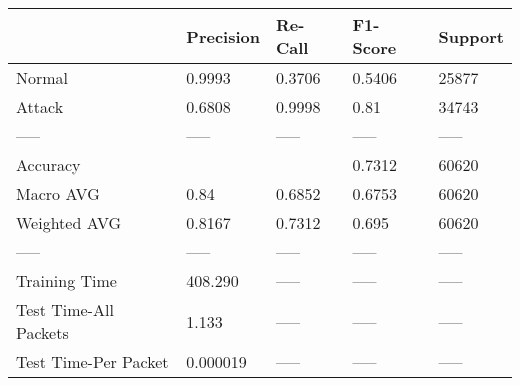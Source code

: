 \begin{tabular}{lllll}
\toprule
{} & Precision & Re-Call & F1-Score & Support \\
\midrule
Normal                &    0.9993 &  0.3706 &   0.5406 &   25877 \\
Attack                &    0.6808 &  0.9998 &     0.81 &   34743 \\
-----                 &     ----- &   ----- &    ----- &   ----- \\
Accuracy              &           &         &   0.7312 &   60620 \\
Macro AVG             &      0.84 &  0.6852 &   0.6753 &   60620 \\
Weighted AVG          &    0.8167 &  0.7312 &    0.695 &   60620 \\
-----                 &     ----- &   ----- &    ----- &   ----- \\
Training Time         &   408.290 &   ----- &    ----- &   ----- \\
Test Time-All Packets &     1.133 &   ----- &    ----- &   ----- \\
Test Time-Per Packet  &  0.000019 &   ----- &    ----- &   ----- \\
\bottomrule
\end{tabular}
